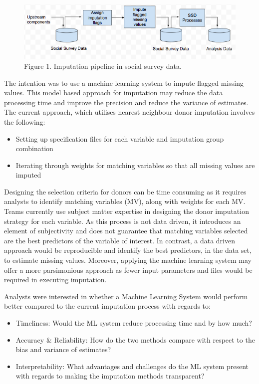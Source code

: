 \documentclass[]{book}
\providecommand{\tightlist}{%
  \setlength{\itemsep}{0pt}\setlength{\parskip}{0pt}}
\begin{document}
\begin{figure}
\centering
\includegraphics{images/CurrentPipeline.png}
\caption{Figure 1. Imputation pipeline in social survey data.}
\end{figure}

The intention was to use a machine learning system to impute flagged
missing values. This model based approach for imputation may reduce the
data processing time and improve the precision and reduce the variance
of estimates. The current approach, which utilises nearest neighbour
donor imputation involves the following:

\begin{itemize}
\tightlist
\item
  Setting up specification files for each variable and imputation group
  combination\\
\item
  Iterating through weights for matching variables so that all missing
  values are imputed
\end{itemize}

Designing the selection criteria for donors can be time consuming as it
requires analysts to identify matching variables (MV), along with
weights for each MV. Teams currently use subject matter expertise in
designing the donor imputation strategy for each variable. As this
process is not data driven, it introduces an element of subjectivity and
does not guarantee that matching variables selected are the best
predictors of the variable of interest. In contrast, a data driven
approach would be reproducible and identify the best predictors, in the
data set, to estimate missing values. Moreover, applying the machine
learning system may offer a more parsimonious approach as fewer input
parameters and files would be required in executing imputation.

Analysts were interested in whether a Machine Learning System would
perform better compared to the current imputation process with regards
to:

\begin{itemize}
\tightlist
\item
  Timeliness: Would the ML system reduce processing time and by how
  much?\\
\item
  Accuracy \& Reliability: How do the two methods compare with respect
  to the bias and variance of estimates?\\
\item
  Interpretability: What advantages and challenges do the ML system
  present with regards to making the imputation methods transparent?
\end{itemize}
\end{document}
